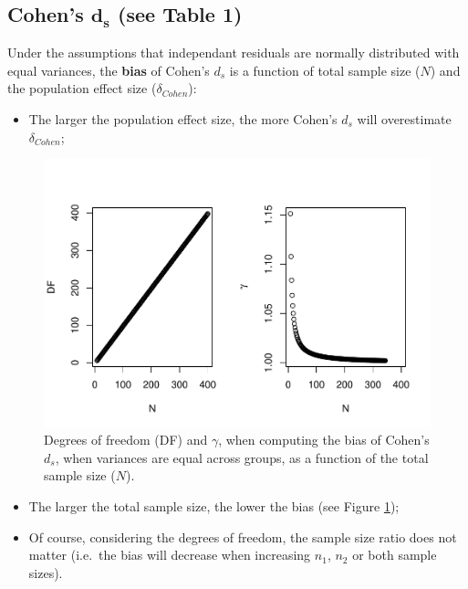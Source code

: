 \documentclass[
  english,
  man,mask]{apa6}
\providecommand{\tightlist}{%
  \setlength{\itemsep}{0pt}\setlength{\parskip}{0pt}}
\begin{document}
\hypertarget{cohens-bmd_s-see-table-1}{%
\subsection{\texorpdfstring{Cohen's \(\bm{d_s}\) (see Table 1)}{Cohen's \textbackslash bm\{d\_s\} (see Table 1)}}\label{cohens-bmd_s-see-table-1}}

Under the assumptions that independant residuals are normally distributed with equal variances, the \textbf{bias} of Cohen's \(d_s\) is a function of total sample size (\(N\)) and the population effect size (\(\delta_{Cohen}\)):

\begin{itemize}
\tightlist
\item
  The larger the population effect size, the more Cohen's \(d_s\) will overestimate \(\delta_{Cohen}\);
\end{itemize}

\begin{figure}
\centering
\includegraphics{Theoretical-Bias-of-all-estimators-as-a-function-of-population-parameters_files/figure-latex/biascohendNsize2-1.pdf}
\caption{\label{fig:biascohendNsize2}Degrees of freedom (DF) and \(\gamma\), when computing the bias of Cohen's \(d_s\), when variances are equal across groups, as a function of the total sample size (\(N\)).}
\end{figure}

\begin{itemize}
\item
  The larger the total sample size, the lower the bias (see Figure \ref{fig:biascohendNsize2});
\item
  Of course, considering the degrees of freedom, the sample size ratio does not matter (i.e.~the bias will decrease when increasing \(n_1\), \(n_2\) or both sample sizes).
\end{itemize}
\end{document}
